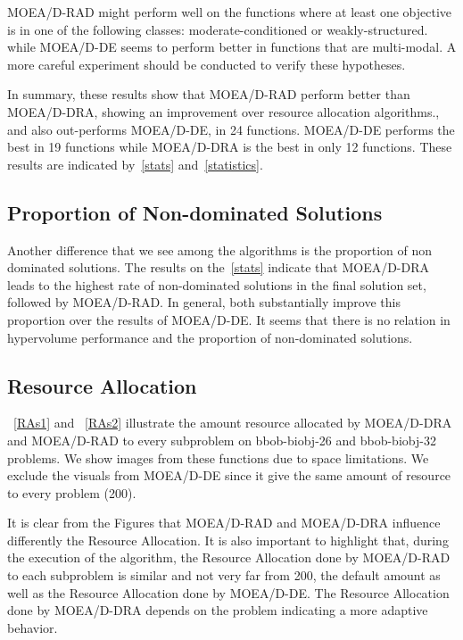 MOEA/D-RAD might perform well on the functions where at least one objective is in one of the following classes: moderate-conditioned or weakly-structured. while MOEA/D-DE seems to perform better in functions that are multi-modal. A more careful experiment should be conducted to verify these hypotheses.

In summary, these results show that MOEA/D-RAD  perform better than MOEA/D-DRA, showing an improvement over resource allocation algorithms., and also out-performs MOEA/D-DE, in 24 functions. MOEA/D-DE performs the best in 19 functions while MOEA/D-DRA is the best in only 12 functions. These results are indicated by~\ref{stats} and~\ref{statistics}.




\subsection{Proportion of Non-dominated Solutions}
%
%
%
Another difference that we see among the algorithms  is the proportion of non dominated solutions. The results on the~\ref{stats} indicate that MOEA/D-DRA leads to the highest rate of non-dominated solutions in the final solution set, followed by MOEA/D-RAD. In general, both substantially improve this proportion over the results of MOEA/D-DE.  It seems that there is no relation in hypervolume performance and the proportion of non-dominated solutions.


\subsection{Resource Allocation}


~\ref{RAs1} and ~\ref{RAs2} illustrate the amount resource allocated by MOEA/D-DRA and MOEA/D-RAD to every subproblem on bbob-biobj-26 and bbob-biobj-32 problems. We show images from these functions due to space limitations. We exclude the visuals from MOEA/D-DE since it give the same amount of resource to every problem (200).

It is clear from the Figures that MOEA/D-RAD and MOEA/D-DRA influence differently the Resource Allocation. It is also important to highlight that, during the execution of the algorithm, the Resource Allocation done by MOEA/D-RAD to each subproblem is similar and not very far from 200, the default amount as well as the Resource Allocation done by MOEA/D-DE. The Resource Allocation done by MOEA/D-DRA depends on the problem indicating a more adaptive behavior. 
